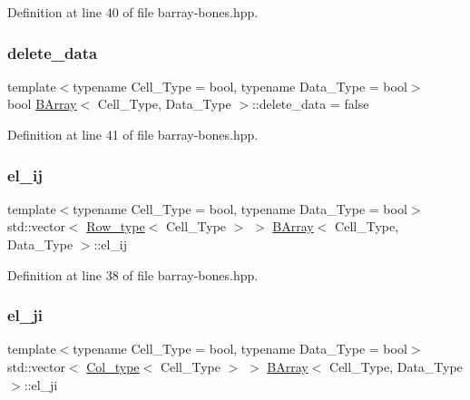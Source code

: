 Definition at line 40 of file barray-\/bones.\+hpp.

\mbox{\label{class_b_array_a1e932e3353905d77a2062560ee96b2fc}} 
\subsubsection{\texorpdfstring{delete\+\_\+data}{delete\_data}}
{\footnotesize\ttfamily template$<$typename Cell\+\_\+\+Type = bool, typename Data\+\_\+\+Type = bool$>$ \\
bool \hyperlink{class_b_array}{B\+Array}$<$ Cell\+\_\+\+Type, Data\+\_\+\+Type $>$\+::delete\+\_\+data = false}



Definition at line 41 of file barray-\/bones.\+hpp.

\mbox{\label{class_b_array_a2161dc7c2046a57d3e663ac5c0d70431}} 
\subsubsection{\texorpdfstring{el\+\_\+ij}{el\_ij}}
{\footnotesize\ttfamily template$<$typename Cell\+\_\+\+Type = bool, typename Data\+\_\+\+Type = bool$>$ \\
std\+::vector$<$ \hyperlink{typedefs_8hpp_a4deca4f3fb25a4da374818ab459b8b4a}{Row\+\_\+type}$<$ Cell\+\_\+\+Type $>$ $>$ \hyperlink{class_b_array}{B\+Array}$<$ Cell\+\_\+\+Type, Data\+\_\+\+Type $>$\+::el\+\_\+ij}



Definition at line 38 of file barray-\/bones.\+hpp.

\mbox{\label{class_b_array_aad8ce1aa5fddd3899164c1aa1dfede94}} 
\subsubsection{\texorpdfstring{el\+\_\+ji}{el\_ji}}
{\footnotesize\ttfamily template$<$typename Cell\+\_\+\+Type = bool, typename Data\+\_\+\+Type = bool$>$ \\
std\+::vector$<$ \hyperlink{typedefs_8hpp_a3bb95a7612ee928fba42f33a96adb3eb}{Col\+\_\+type}$<$ Cell\+\_\+\+Type $>$ $>$ \hyperlink{class_b_array}{B\+Array}$<$ Cell\+\_\+\+Type, Data\+\_\+\+Type $>$\+::el\+\_\+ji}



